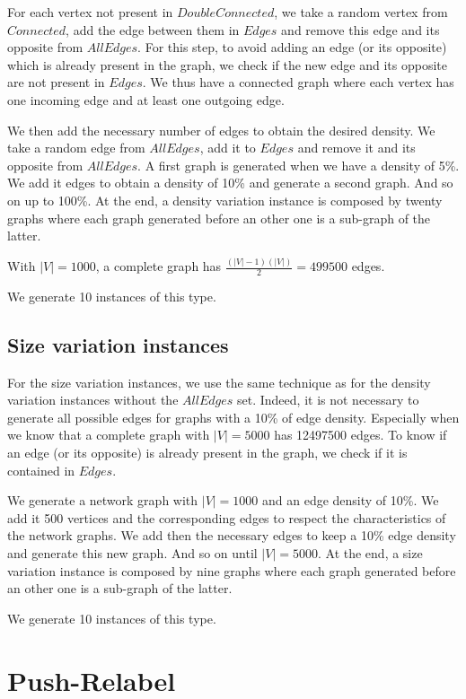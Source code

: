 For each vertex not present in $DoubleConnected$, we take a random vertex from $Connected$, add the edge between them in $Edges$ and remove this edge and its opposite from $AllEdges$. For this step, to avoid adding an edge (or its opposite) which is already present in the graph, we check if the new edge and its opposite are not present in $Edges$. We thus have a connected graph where each vertex has one incoming edge and at least one outgoing edge.

We then add the necessary number of edges to obtain the desired density. We take a random edge from $AllEdges$, add it to $Edges$ and remove it and its opposite from $AllEdges$. A first graph is generated when we have a density of 5\%. We add it edges to obtain a density of 10\% and generate a second graph. And so on up to 100\%. At the end, a density variation instance is composed by twenty graphs where each graph generated before an other one is a sub-graph of the latter.

With $|V|=1000$, a complete graph has $\frac{(|V|-1)(|V|)}{2} = 499500$ edges.

We generate 10 instances of this type.

\subsection{Size variation instances}
For the size variation instances, we use the same technique as for the density variation instances without the $AllEdges$ set. Indeed, it is not necessary to generate all possible edges for graphs with a 10\% of edge density. Especially when we know that a complete graph with $|V|=5000$ has 12497500 edges. To know if an edge (or its opposite) is already present in the graph, we check if it is contained in $Edges$.

We generate a network graph with $|V|=1000$ and an edge density of 10\%. We add it 500 vertices and the corresponding edges to respect the characteristics of the network graphs. We add then the necessary edges to keep a 10\% edge density and generate this new graph. And so on until $|V|=5000$. At the end, a size variation instance is composed by nine graphs where each graph generated before an other one is a sub-graph of the latter.

We generate 10 instances of this type.

\section{Push-Relabel}
